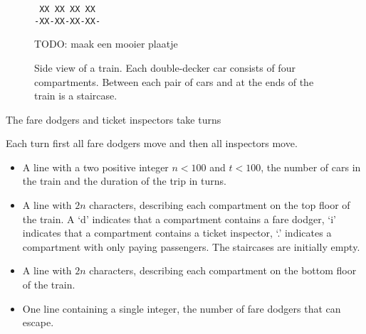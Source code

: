 




\begin{wrapfigure}{r}{0.4\textwidth}
  \vspace{-1em}
  \centering
\begin{verbatim}
 XX XX XX XX
-XX-XX-XX-XX-
\end{verbatim}
TODO: maak een mooier plaatje
  \caption{Side view of a train. Each double-decker car consists of four compartments. Between each pair of cars and at the ends of the train is a staircase.}
  \label{fig:train}
\end{wrapfigure}

The fare dodgers and ticket inspectors take turns

Each turn first all fare dodgers move and then all inspectors move.

\Input
\begin{itemize}
 \item A line with a two positive integer $n < 100$ and $t < 100$, the number of cars in the train and the duration of the trip in turns.
 \item A line with $2n$ characters, describing each compartment on the top floor of the train.
       A `d' indicates that a compartment contains a fare dodger,
         `i' indicates that a compartment contains a ticket inspector,
         `.' indicates a compartment with only paying passengers.
       The staircases are initially empty.
 \item A line with $2n$ characters, describing each compartment on the bottom floor of the train.
\end{itemize}

\Output
\begin{itemize}
 \item One line containing a single integer, the number of fare dodgers that can escape.
\end{itemize}

\Example
